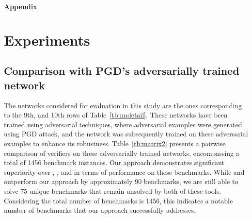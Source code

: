 
\begin{center}
    \Large{\bf{Appendix}}    
\end{center}

\section{Experiments}
\subsection{Comparison with PGD's adversarially trained network}
\label{ap:exp:1}

The networks considered for evaluation in this study are the ones corresponding to the 9th, and 10th 
rows of Table~\ref{tb:nndetail}. These networks have been trained using adversarial techniques, 
where adversarial examples were generated using PGD attack, and the network was subsequently 
trained on these adversarial examples to enhance its robustness. Table~\ref{tb:matrix2} presents a 
pairwise comparison of verifiers on these adversarially trained networks, 
encompassing a total of 1456 benchmark instances. 
Our approach demonstrates significant superiority over \deeppoly{}, \kpoly{}, and \deepsrgr{} in terms of 
performance on these benchmarks. While \alphabeta{} and \ovaltool{} outperform our approach by approximately 
90 benchmarks, we are still able to solve 75 unique benchmarks that remain unsolved by both of these tools. 
Considering the total number of benchmarks is 1456, this indicates a notable number of benchmarks that our 
approach successfully addresses.

